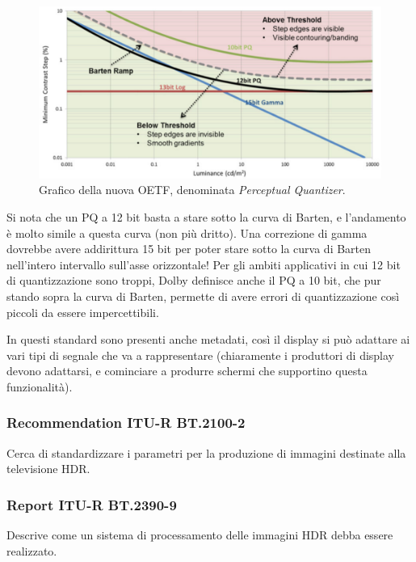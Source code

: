 \documentclass[a4paper,11pt]{article}
\begin{document}
\renewcommand{\thefigure}{4.24}
\begin{figure}[!h]
  \centering
    \includegraphics[scale=0.45]{images/4/pq.png}
    \caption{Grafico della nuova OETF, denominata \textit{Perceptual Quantizer}.}
\end{figure}

Si nota che un PQ a 12 bit basta a stare sotto la curva di Barten, e l'andamento è molto simile a questa curva (non più dritto). Una correzione di gamma dovrebbe avere
addirittura 15 bit per poter stare sotto la curva di Barten nell'intero intervallo sull'asse orizzontale! Per gli ambiti applicativi in cui 12 bit di quantizzazione sono troppi,
Dolby definisce anche il PQ a 10 bit, che pur stando sopra la curva di Barten, permette di avere errori di quantizzazione così piccoli da essere impercettibili.
\par
In questi standard sono presenti anche metadati, così il display si può adattare ai vari tipi di segnale che va a rappresentare (chiaramente
i produttori di display devono adattarsi, e cominciare a produrre schermi che supportino questa funzionalità).

\subsubsection{Recommendation ITU-R BT.2100-2}
Cerca di standardizzare i parametri per la produzione di immagini destinate alla televisione HDR.

\subsubsection{Report ITU-R BT.2390-9}
Descrive come un sistema di processamento delle immagini HDR debba essere realizzato.
\end{document}
